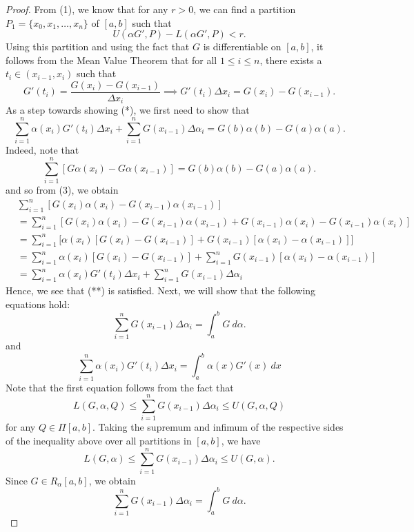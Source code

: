 \documentclass[a4paper]{article}
\begin{document}
\begin{proof}
    From (1), we know that for any \( r > 0  \), we can find a partition \( {P}_{1} = \{ {x}_{0}, {x}_{1}, \dots, {x}_{n} \}  \) of  \( [a,b] \) such that 
            \[  U(\alpha G' , P) - L(\alpha G', P ) < r. \]
    Using this partition and using the fact that \( G  \) is differentiable on \( [a,b] \), it follows from the Mean Value Theorem that for all \( 1 \leq i \leq n  \), there exists a \( {t}_{i} \in ({x}_{i-1}, {x}_{i}) \) such that 
    \[  G'({t}_{i}) = \frac{ G({x}_{i}) - G({x}_{i-1}) }{ \Delta {x}_{i} } \implies G'({t}_{i}) \Delta {x}_{i} = G({x}_{i}) - G({x}_{i-1}). \tag{3} \]
    As a step towards showing (*), we first need to show that 
    \[  \sum_{ i=1  }^{ n } \alpha({x}_{i}) G'({t}_{i}) \Delta {x}_{i} + \sum_{ i=1  }^{ n } G({x}_{i-1}) \Delta {\alpha}_{i} = G(b) \alpha(b) - G(a) \alpha(a). \tag{**}  \]
Indeed, note that 
    \[  \sum_{ i=1  }^{ n } [G \alpha({x}_{i}) - G \alpha({x}_{i-1})] = G(b) \alpha(b) - G(a) \alpha(a). \]
    and so from (3), we obtain
    \begin{align*}
        &\sum_{ i=1  }^{ n } [G({x}_{i}) \alpha ({x}_{i}) - G({x}_{i-1}) \alpha({x}_{i-1})] \\ 
                                                                                          &= \sum_{ i=1  }^{ n } [ G({x}_{i}) \alpha({x}_{i}) - G({x}_{i-1}) \alpha({x}_{i-1}) + G({x}_{i-1}) \alpha({x}_{i}) - G({x}_{i-1}) \alpha({x}_{i})] \\
                                                                                          &= \sum_{ i=1  }^{ n } \big[\alpha({x}_{i}) [G({x}_{i}) - G({x}_{i-1})] + G({x}_{i-1}) [\alpha({x}_{i}) - \alpha({x}_{i-1})]\big] \\
                                                                                          &= \sum_{ i=1  }^{ n } \alpha({x}_{i}) [G({x}_{i}) - G({x}_{i-1})] + \sum_{ i=1  }^{ n } G({x}_{i-1}) [\alpha({x}_{i}) - \alpha({x}_{i-1})] \\
                                                                                          &= \sum_{ i=1  }^{ n } \alpha({x}_{i}) G'({t}_{i}) \Delta {x}_{i} + \sum_{ i=1  }^{ n } G({x}_{i-1}) \Delta \alpha_{i}
    \end{align*}
     Hence, we see that (**) is satisfied. Next, we will show that the following equations hold:
     \[ \sum_{ i=1  }^{ n } G({x}_{i-1}) \Delta {\alpha}_{i} = \int_{ a }^{ b }  G \ d \alpha. \tag{4}  \]
    and
    \[  \sum_{ i=1  }^{ n } \alpha({x}_{i}) G'({t}_{i}) \Delta {x}_{i} = \int_{ a }^{ b }  \alpha(x) G'(x) \ dx \tag{5} \]
Note that the first equation follows from the fact that
    \[  L(G, \alpha, Q) \leq \sum_{ i=1  }^{ n } G({x}_{i-1}) \Delta {\alpha}_{i} \leq U(G, \alpha, Q)  \]
    for any \( Q \in \Pi [a,b] \).
      Taking the supremum and infimum of the respective sides of the inequality above over all partitions in \( [a,b] \), we have 
     \[  L(G, \alpha) \leq \sum_{ i=1  }^{ n } G({x}_{i-1}) \Delta {\alpha}_{i} \leq U(G, \alpha).  \]
     Since \( G \in {R}_{\alpha}[a,b] \), we obtain
     \[  \sum_{ i=1  }^{ n } G({x}_{i-1}) \Delta {\alpha}_{i} = \int_{ a }^{ b }  G  \ d \alpha.   \]


\end{proof}
\end{document}
